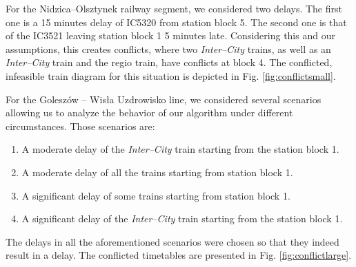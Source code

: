 For the Nidzica--Olsztynek railway segment, we considered two delays. The first one is a 15 minutes delay
of IC5320 from station block 5. The second one is that of the IC3521 leaving station block 1 5 minutes late.
Considering this and our assumptions, this creates conflicts, where two \emph{Inter--City} trains, as well
as an \emph{Inter--City} train and the regio train, have conflicts at block 4. The conflicted, infeasible
train diagram for this situation is depicted in Fig. \ref{fig:conflictsmall}.

For the Goleszów -- Wisła Uzdrowisko line, we considered several scenarios allowing us to analyze the
behavior of our algorithm under different circumstances. Those scenarios are:

\begin{enumerate}
  \item A moderate delay of the \emph{Inter--City} train starting from the station block 1.
  \item A moderate delay of all the trains starting from station block 1.
  \item A significant delay of some trains starting from station block 1.
  \item A significant delay of the \emph{Inter--City} train starting from the station block 1.
\end{enumerate}

The delays in all the aforementioned scenarios were chosen so that they indeed result in a delay.
The conflicted timetables are presented in Fig. \ref{fig:conflictlarge}.

